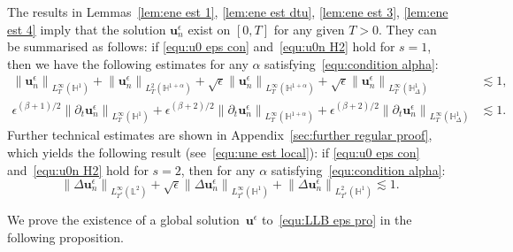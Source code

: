\documentclass[11pt,reqno]{amsart}
\theoremstyle{definition}
\numberwithin{equation}{section}
\newcommand{\bff}{\boldsymbol}
\newcommand{\bb}{\mathbb}
\newcommand{\pa}{\partial}
\newcommand{\norm}[2]{\left\|{#1}\right\|_{#2}}
\begin{document}
The results in Lemmas~\ref{lem:ene est 1}, \ref{lem:ene est dtu}, \ref{lem:ene est 3}, \ref{lem:ene est 4} imply that the solution $\bff{u}_n^\epsilon$ exist on $[0,T]$ for any given $T>0$. They can be summarised as follows: if \eqref{equ:u0 eps con} and~\eqref{equ:u0n H2} hold for $s=1$, then we have the following estimates for any $\alpha$ satisfying~\eqref{equ:condition alpha}:
\begin{equation}\label{equ:une all}
	\begin{aligned}
		\norm{\bff{u}_n^\epsilon}{L^\infty_T(\bb{H}^1)}
		+
		\norm{\bff{u}_n^\epsilon}{L^2_T(\bb{H}^{1+\alpha})}
		+
		\sqrt{\epsilon} \norm{\bff{u}_n^\epsilon}{L^\infty_T(\bb{H}^{1+\alpha})}
		+
		\sqrt{\epsilon} \norm{\bff{u}_n^\epsilon}{L^\infty_T(\bb{H}^{1}_\Delta)}
		&\lesssim 1,
		\\
		\epsilon^{(\beta+1)/2} \norm{\pa_t\bff{u}_n^\epsilon}{L^\infty_T(\bb{H}^1)}
		+
		\epsilon^{(\beta+2)/2} \norm{\pa_t\bff{u}_n^\epsilon}{L^\infty_T(\bb{H}^{1+\alpha})}
		+
		\epsilon^{(\beta+2)/2} \norm{\pa_t\bff{u}_n^\epsilon}{L^\infty_T(\bb{H}^1_\Delta)}
		&\lesssim 1.
	\end{aligned}
\end{equation}
Further technical estimates are shown in Appendix~\ref{sec:further regular proof}, which yields the following result (see~\eqref{equ:une est local}): if \eqref{equ:u0 eps con} and~\eqref{equ:u0n H2} hold for $s=2$, then for any $\alpha$ satisfying~\eqref{equ:condition alpha}:
\begin{equation}\label{equ:une all app}
		\norm{\Delta \bff{u}_n^\epsilon}{L^\infty_{T^\ast}(\bb{L}^2)}
        +
        \sqrt{\epsilon} \norm{\Delta \bff{u}_n^\epsilon}{L^\infty_{T^\ast}(\bb{H}^1)}
		+
		\norm{\Delta \bff{u}_n^\epsilon}{L^2_{T^\ast}(\bb{H}^1)}
		\lesssim 1.
\end{equation}


We prove the existence of a global solution~$\bff{u}^\epsilon$ to~\eqref{equ:LLB eps pro} in the following proposition.
\end{document}
